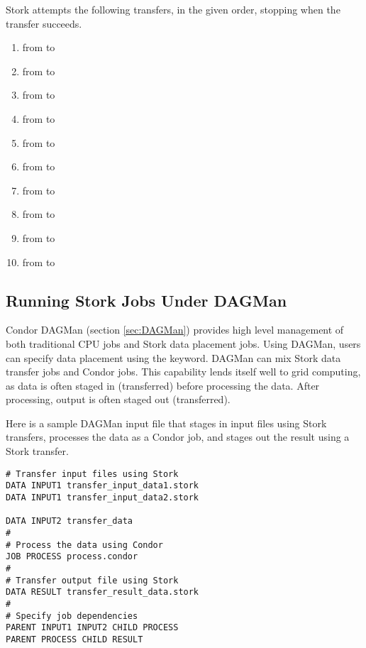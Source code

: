 Stork attempts the following transfers, in the given order,
stopping when the transfer succeeds.
\begin{enumerate}
    \item from 
            to
    \item from 
            to
    \item from 
            to
    \item from 
            to
    \item from 
            to
    \item from 
            to
    \item from 
            to
    \item from 
            to
    \item from 
            to
    \item from 
            to
\end{enumerate}

\subsection{\label{sec:Stork-Advanced}Running Stork Jobs Under DAGMan}

Condor DAGMan (section \ref{sec:DAGMan}) provides high level management
of both traditional CPU jobs and Stork data placement jobs. 
Using DAGMan, users can specify data placement
using the  keyword.
DAGMan can mix Stork data transfer jobs 
and Condor jobs.
This capability lends itself well to grid computing,
as data is often staged in (transferred)
before processing the data.
After processing, output is often staged out (transferred).

Here is a sample DAGMan input file
that stages in input files using Stork transfers,
processes the data as a Condor job,
and stages out the result using a Stork transfer.

\footnotesize
\begin{verbatim}
# Transfer input files using Stork
DATA INPUT1 transfer_input_data1.stork
DATA INPUT1 transfer_input_data2.stork

DATA INPUT2 transfer_data
#
# Process the data using Condor
JOB PROCESS process.condor
#
# Transfer output file using Stork
DATA RESULT transfer_result_data.stork
#
# Specify job dependencies
PARENT INPUT1 INPUT2 CHILD PROCESS
PARENT PROCESS CHILD RESULT
\end{verbatim}
\normalsize

